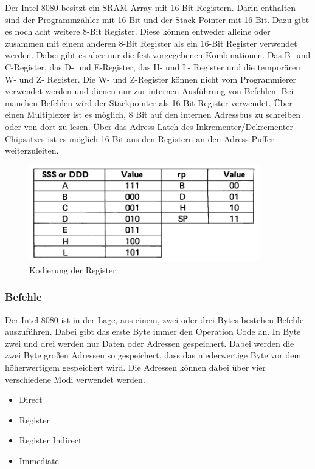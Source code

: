 \documentclass[12pt]{article}
\newcommand{\imgSpaceBefore}{\vspace{10pt}}
\begin{document}
Der Intel 8080 besitzt ein SRAM-Array mit 16-Bit-Registern. Darin enthalten sind der Programmzähler mit 16 Bit und der Stack Pointer mit 16-Bit. Dazu gibt es noch acht weitere 8-Bit Register. Diese können entweder alleine oder zusammen mit einem anderen 8-Bit Register als ein 16-Bit Register verwendet werden. Dabei gibt es aber nur die fest vorgegebenen Kombinationen. Das B- und C-Register, das D- und E-Register, das H- und L- Register und die temporären W- und Z- Register. Die W- und Z-Register können nicht vom Programmierer verwendet werden und dienen nur zur internen Ausführung von Befehlen. Bei manchen Befehlen wird der Stackpointer als 16-Bit Register verwendet.
Über einen Multiplexer ist es möglich, 8 Bit auf den internen Adressbus zu schreiben oder von dort zu lesen. Über das Adress-Latch des Inkrementer/Dekrementer-Chipsatzes ist es möglich 16 Bit aus den Registern an den Adress-Puffer weiterzuleiten. \cite{IntMan16}


\imgSpaceBefore
\begin{figure}[h]
\centering
\includegraphics[width=10cm]{Bilder/register_kodierung}
\caption{Kodierung der Register \cite{IntMan30}}
\label{fig:register_kodierung}
\end{figure}

\subsubsection{Befehle}

Der Intel 8080 ist in der Lage, aus einem, zwei oder drei Bytes bestehen Befehle auszuführen. Dabei gibt das erste Byte immer den Operation Code an. In Byte zwei und drei werden nur Daten oder Adressen gespeichert. Dabei werden die zwei Byte großen Adressen so gespeichert, dass das niederwertige Byte vor dem höherwertigem gespeichert wird. Die Adressen können dabei über vier verschiedene Modi verwendet werden.

\begin{itemize}
\item Direct
\item Register
\item Register Indirect
\item Immediate
\end{itemize}
\end{document}
